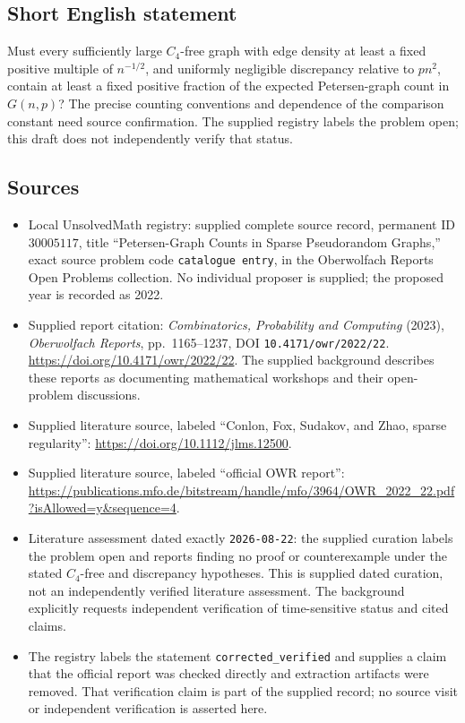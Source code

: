 \documentclass[11pt]{article}
\begin{document}
\subsection{Short English statement}
Must every sufficiently large \(C_4\)-free graph with edge density at least a fixed positive multiple of \(n^{-1/2}\), and uniformly negligible discrepancy relative to \(pn^2\), contain at least a fixed positive fraction of the expected Petersen-graph count in \(G(n,p)\)? The precise counting conventions and dependence of the comparison constant need source confirmation. The supplied registry labels the problem open; this draft does not independently verify that status.
\subsection{Sources}
\begin{itemize}
\item Local UnsolvedMath registry: supplied complete source record, permanent ID \(30005117\), title ``Petersen-Graph Counts in Sparse Pseudorandom Graphs,'' exact source problem code \texttt{catalogue entry}, in the Oberwolfach Reports Open Problems collection. No individual proposer is supplied; the proposed year is recorded as 2022.
\item Supplied report citation: \emph{Combinatorics, Probability and Computing} (2023), \emph{Oberwolfach Reports}, pp.~1165--1237, DOI \texttt{10.4171/owr/2022/22}. \url{https://doi.org/10.4171/owr/2022/22}. The supplied background describes these reports as documenting mathematical workshops and their open-problem discussions.
\item Supplied literature source, labeled ``Conlon, Fox, Sudakov, and Zhao, sparse regularity'': \url{https://doi.org/10.1112/jlms.12500}.
\item Supplied literature source, labeled ``official OWR report'': \url{https://publications.mfo.de/bitstream/handle/mfo/3964/OWR_2022_22.pdf?isAllowed=y&sequence=4}.
\item Literature assessment dated exactly \texttt{2026-08-22}: the supplied curation labels the problem open and reports finding no proof or counterexample under the stated \(C_4\)-free and discrepancy hypotheses. This is supplied dated curation, not an independently verified literature assessment. The background explicitly requests independent verification of time-sensitive status and cited claims.
\item The registry labels the statement \texttt{corrected\_verified} and supplies a claim that the official report was checked directly and extraction artifacts were removed. That verification claim is part of the supplied record; no source visit or independent verification is asserted here.
\end{itemize}
\end{document}
